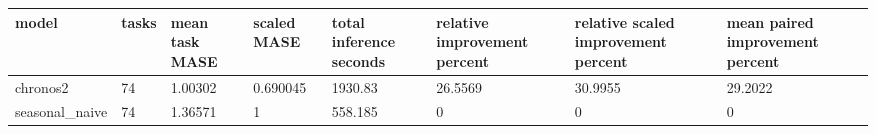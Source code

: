 \begin{tabular}{llllllll}
\toprule
model & tasks & mean task MASE & scaled MASE & total inference seconds & relative improvement percent & relative scaled improvement percent & mean paired improvement percent \\
\midrule
chronos2 & 74 & 1.00302 & 0.690045 & 1930.83 & 26.5569 & 30.9955 & 29.2022 \\
seasonal\_naive & 74 & 1.36571 & 1 & 558.185 & 0 & 0 & 0 \\
\bottomrule
\end{tabular}

